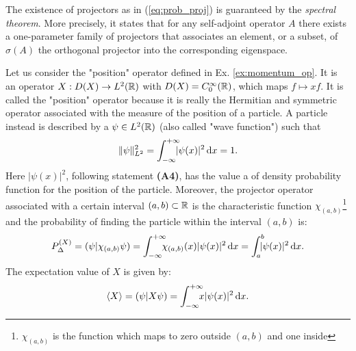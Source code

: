  \begin{oss}
 	The existence of projectors as in (\ref{eq:prob_proj}) is guaranteed by the \textit{spectral theorem}. More precisely, it states that for any self-adjoint operator $A$ there exists a one-parameter family of projectors that associates an element, or a subset, of $\sigma(A)$ the orthogonal projector into the corresponding eigenspace.
 \end{oss}
 
 \begin{example}
 	Let us consider the "position" operator defined in Ex. \ref{ex:momentum_op}. It is an operator $X:D(X)\to L^2({\mathbb R})$ with $D(X)=C^\infty_0({\mathbb R})$, which maps $f\mapsto xf$. It is called the "position" operator because it is really the Hermitian and symmetric operator associated with the measure of the position of a particle. A particle instead is described by a $\psi\in L^2({\mathbb R})$ (also called "wave function") such that
 	\begin{equation}
 		\|\psi\|_{L^2}^2=\int_{-\infty}^{+\infty}\!\!\!\!|\psi(x)|^2\, \mathrm d x =1.
 	\end{equation}
 	Here $|\psi(x)|^2$, following statement \textbf{(A4)}, has the value a of density probability function for the position of the particle. Moreover, the projector operator associated with a certain interval $(a,b)\subset{\mathbb R}$ is the characteristic function $\chi_{(a,b)}$\footnote{$\chi_{(a,b)}$ is the function which maps to zero outside $(a,b)$ and one inside} and the probability of finding the particle within the interval $(a,b)$ is:
 	\begin{equation}
 		P_\Delta^{(X)}=(\psi|\chi_{(a,b)}\psi)=\int_{-\infty}^{+\infty}\nspace\! \chi_{(a,b)}(x)|\psi(x)|^2\, \dd x=\int_{a}^{b}\nspace\!|\psi(x)|^2\, \dd x.
 	\end{equation} 
 	The expectation value of $X$ is given by:
 	\begin{equation}
 		\braket{X}=(\psi|X\psi)=\int_{-\infty}^{+\infty}\!\!\!\!x|\psi(x)|^2\, \mathrm d x.
 	\end{equation}
 \end{example}
